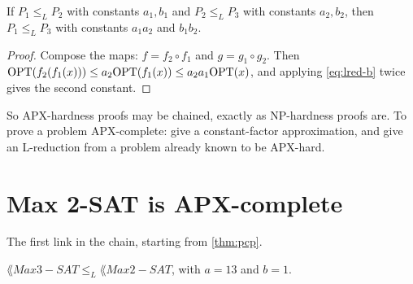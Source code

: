 \begin{lemma}\label{lem:lred-composes}
If $P_1 \le_L P_2$ with constants $a_1, b_1$ and $P_2 \le_L P_3$ with constants
$a_2, b_2$, then $P_1 \le_L P_3$ with constants $a_1a_2$ and $b_1b_2$.
\end{lemma}

\begin{proof}
Compose the maps: $f = f_2 \circ f_1$ and $g = g_1 \circ g_2$. Then
$\mathrm{OPT}(f_2(f_1(x))) \le a_2 \mathrm{OPT}(f_1(x)) \le a_2a_1\mathrm{OPT}(x)$, and applying
\eqref{eq:lred-b} twice gives the second constant.
\end{proof}

So APX-hardness proofs may be chained, exactly as \textrm{NP}-hardness proofs
are. To prove a problem APX-complete: give a constant-factor approximation, and
give an L-reduction from a problem already known to be APX-hard.

\section{Max 2-SAT is APX-complete}
\label{sec:max2sat-apx}

The first link in the chain, starting from \cref{thm:pcp}.

\begin{theorem}\label{thm:max3sat-max2sat}
$\lang{Max 3-SAT} \le_L \lang{Max 2-SAT}$, with $a = 13$ and $b = 1$.
\end{theorem}

